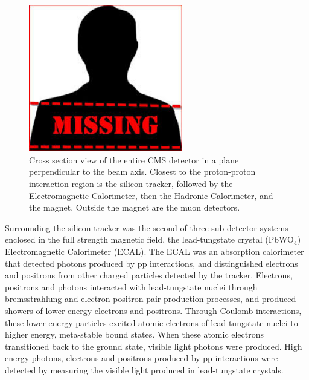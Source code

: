 \begin{figure}[h]
	\centering
	\includegraphics[width=0.6\textwidth]{figures/missingImage.png}
	\caption{Cross section view of the entire CMS detector in a plane perpendicular to the beam axis.  Closest to the
	proton-proton interaction region is the silicon tracker, followed by the Electromagnetic Calorimeter, then the Hadronic 
Calorimeter, and the magnet.  Outside the magnet are the muon detectors.}
	\label{fig:layersOfCMS}
\end{figure}


Surrounding the silicon tracker was the second of three sub-detector systems enclosed in the full strength magnetic field, the
lead-tungstate crystal (PbWO$_{4}$) Electromagnetic Calorimeter (ECAL).  The ECAL was an absorption calorimeter that
detected photons produced by pp interactions, and distinguished electrons and positrons from other charged 
particles detected by the tracker.  Electrons, positrons and photons interacted with lead-tungstate nuclei 
through bremsstrahlung and electron-positron pair production processes, and produced showers of lower energy
electrons and positrons.  Through Coulomb interactions, these lower energy particles excited atomic electrons
of lead-tungstate nuclei to higher energy, meta-stable bound states.  When these atomic electrons transitioned
back to the ground state, visible light photons were produced.  High energy photons, electrons and positrons 
produced by pp interactions were detected by measuring the visible light produced in lead-tungstate crystals.

